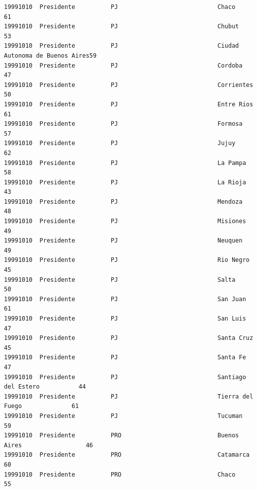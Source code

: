 \documentclass[a4paper,10pt]{article}
\begin{document}
\begin{verbatim}
19991010  Presidente          PJ                            Chaco                         61             
19991010  Presidente          PJ                            Chubut                        53             
19991010  Presidente          PJ                            Ciudad Autonoma de Buenos Aires59             
19991010  Presidente          PJ                            Cordoba                       47             
19991010  Presidente          PJ                            Corrientes                    50             
19991010  Presidente          PJ                            Entre Rios                    61             
19991010  Presidente          PJ                            Formosa                       57             
19991010  Presidente          PJ                            Jujuy                         62             
19991010  Presidente          PJ                            La Pampa                      58             
19991010  Presidente          PJ                            La Rioja                      43             
19991010  Presidente          PJ                            Mendoza                       48             
19991010  Presidente          PJ                            Misiones                      49             
19991010  Presidente          PJ                            Neuquen                       49             
19991010  Presidente          PJ                            Rio Negro                     45             
19991010  Presidente          PJ                            Salta                         50             
19991010  Presidente          PJ                            San Juan                      61             
19991010  Presidente          PJ                            San Luis                      47             
19991010  Presidente          PJ                            Santa Cruz                    45             
19991010  Presidente          PJ                            Santa Fe                      47             
19991010  Presidente          PJ                            Santiago del Estero           44             
19991010  Presidente          PJ                            Tierra del Fuego              61             
19991010  Presidente          PJ                            Tucuman                       59             
19991010  Presidente          PRO                           Buenos Aires                  46             
19991010  Presidente          PRO                           Catamarca                     60             
19991010  Presidente          PRO                           Chaco                         55             

\end{verbatim}
\end{document}
